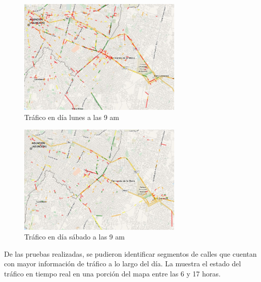 \begin{figure}[!ht]
	\centering
	\includegraphics[width=0.7\textwidth]{capitulos/7/figuras/figura6.jpg}
	\caption{\label{fig:trafico_lunes} Tráfico en día lunes a las 9 am}	
\end{figure}

\begin{figure}[!ht]
	\centering
	\includegraphics[width=0.7\textwidth]{capitulos/7/figuras/figura7.jpg}
	\caption{\label{fig:trafico_sabado} Tráfico en día sábado a las 9 am}	
\end{figure}

De las pruebas realizadas, se pudieron identificar segmentos de calles que cuentan con mayor información de tráfico a lo largo del día. La  muestra el estado del tráfico en tiempo real en una porción del mapa entre las 6 y 17 horas.

